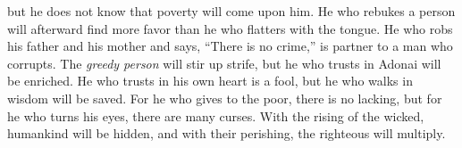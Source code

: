 \begin{biblechapter}
but he does not know that poverty will come upon him.
\verse He who rebukes a person will afterward find more favor 
than he who flatters with the tongue.
\verse He who robs his father and his mother and says, “There is no crime,” 
is partner to a man who corrupts.
\verse The \textit{greedy person} will stir up strife, 
but he who trusts in Adonai will be enriched.
\verse He who trusts in his own heart is a fool, 
but he who walks in wisdom will be saved.
\verse For he who gives to the poor, there is no lacking, 
but for he who turns his eyes, there are many curses.
\verse With the rising of the wicked, humankind will be hidden, 
and with their perishing, the righteous will multiply.
\end{biblechapter}

